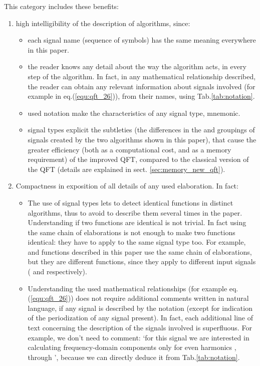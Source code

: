 \documentclass[a4paper,10pt]{article}
\begin{document}
This category includes these benefits:
\begin{enumerate}

\item
high intelligibility of the description of algorithms, since:
\begin{itemize}

\item
each signal name (sequence of symbols) has the same meaning everywhere in this paper.


\item
the reader knows any detail about the way the algorithm acts, in every step of the algorithm. 
In fact, in any mathematical relationship described, the reader can obtain any relevant information about signals involved (for example in eq.(\ref{equ:qft_26})), from their names, using Tab.\ref{tab:notation}.  

\item
used notation make the characteristics of any signal type, mnemonic. 


\item
signal types explicit the subtleties (the differences in the  and  groupings of signals created by the two algorithms shown in this paper),  that cause the greater efficiency (both as a computational cost, and as a memory requirement) of the improved QFT, compared to the classical version of the QFT (details are explained in sect. \ref{sec:memory_new_qft}).

\end{itemize}

\item
Compactness in exposition of all details of any used elaboration.
In fact:
\begin{itemize}

\item
The use of signal types lets to detect identical functions in distinct algorithms, thus to avoid to describe them several times in the paper. 
Understanding if two functions are identical is not trivial.
In fact using the same chain of elaborations is not enough to make two functions identical: they have to apply to the same signal type too.
For example,  and  functions described in this paper use the same chain of elaborations, but they are different functions, since they apply to different input signals ( and  respectively).



\item
Understanding the used mathematical relationships (for example eq. (\ref{equ:qft_26})) does not require additional comments written in natural language, if any signal is described by the notation 
(except for indication of the periodization of any signal present). 
In fact, each additional line of text concerning the description of the signals involved is superfluous. 
For example, we don't need to comment: `for this signal we are interested  in calculating frequency-domain components only for even harmonics , through ', because we can  directly deduce it from Tab.\ref{tab:notation}.



\end{itemize}
\end{enumerate}
\end{document}
